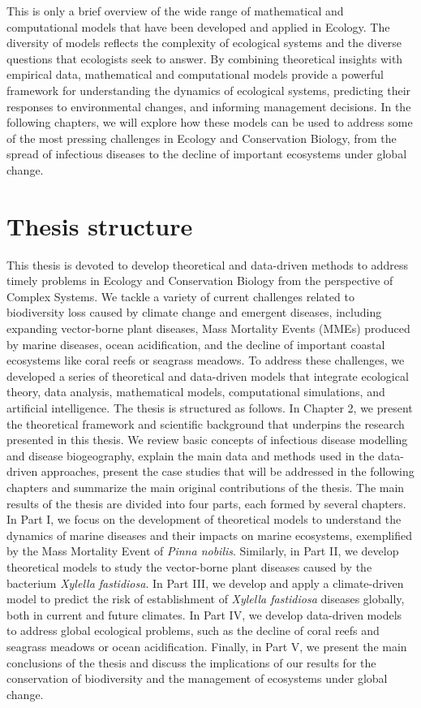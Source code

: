 This is only a brief overview of the wide range of mathematical and
computational models that have been developed and applied in Ecology. The
diversity of models reflects the complexity of ecological systems and the
diverse questions that ecologists seek to answer. By combining theoretical
insights with empirical data, mathematical and computational models provide a
powerful framework for understanding the dynamics of ecological systems,
predicting their responses to environmental changes, and informing management
decisions. In the following chapters, we will explore how these models can be
used to address some of the most pressing challenges in Ecology and
Conservation Biology, from the spread of infectious diseases to the decline of
important ecosystems under global change.

\section{\label{sec:Thesis structure} Thesis structure}

This thesis is devoted to develop theoretical and data-driven methods to
address timely problems in Ecology and Conservation Biology from the
perspective of Complex Systems. We tackle a variety of current challenges
related to biodiversity loss caused by climate change and emergent diseases,
including expanding vector-borne plant diseases, Mass Mortality Events (MMEs)
produced by marine diseases, ocean acidification, and the decline of important
coastal ecosystems like coral reefs or seagrass meadows. To address these
challenges, we developed a series of theoretical and data-driven models that
integrate ecological theory, data analysis, mathematical models, computational
simulations, and artificial intelligence. The thesis is structured as follows.
In Chapter 2, we present the theoretical framework and scientific background
that underpins the research presented in this thesis. We review basic concepts
of infectious disease modelling and disease biogeography, explain the main
data and methods used in the data-driven approaches, present the case
studies that will be addressed in the following chapters and summarize the main
original contributions of the thesis. The main results of
the thesis are divided into four parts, each formed by several chapters. In
Part I, we focus on the development of theoretical models to understand the
dynamics of marine diseases and their impacts on marine ecosystems,
exemplified by the Mass Mortality Event of \textit{Pinna nobilis}. Similarly,
in Part II, we develop theoretical models to study the vector-borne plant
diseases caused by the bacterium \textit{Xylella fastidiosa}. In Part III, we
develop and apply a climate-driven model to predict the risk of establishment
of \textit{Xylella fastidiosa} diseases globally, both in current and future
climates. In Part IV, we develop data-driven models to address global
ecological problems, such as the decline of coral reefs and seagrass meadows
or ocean acidification. Finally, in Part V, we present the main conclusions of
the thesis and discuss the implications of our results for the conservation of
biodiversity and the management of ecosystems under global change.